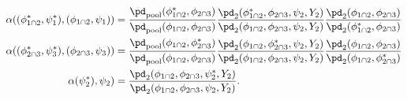 \begin{align}
  \alpha((\phi_{1 \cap 2}^{*}, \psi_{1}^{*}), (\phi_{1 \cap 2}, \psi_{1})) &= 
    \frac {
      \pd_{\text{pool}}(\phi_{1 \cap 2}^{*}, \phi_{2 \cap 3})
    } {
      \pd_{\text{pool}}(\phi_{1 \cap 2}, \phi_{2 \cap 3})
    }
    \frac {
      \pd_{2}(\phi_{1 \cap 2}^{*}, \phi_{2 \cap 3}, \psi_{2}, Y_{2})
    } {
      \pd_{2}(\phi_{1 \cap 2}, \phi_{2 \cap 3}, \psi_{2}, Y_{2})
    }
    \frac {
      \pd_{2} (\phi_{1 \cap 2}, \phi_{2 \cap 3})
    } {
      \pd_{2} (\phi_{1 \cap 2}^{*}, \phi_{2 \cap 3})
    }
  \\
  \alpha((\phi_{2 \cap 3}^{*}, \psi_{3}^{*}), (\phi_{2 \cap 3}, \psi_{3})) &= 
    \frac {
      \pd_{\text{pool}}(\phi_{1 \cap 2}, \phi_{2 \cap 3}^{*})
    } {
      \pd_{\text{pool}}(\phi_{1 \cap 2}, \phi_{2 \cap 3})
    }
    \frac {
      \pd_{2}(\phi_{1 \cap 2}, \phi_{2 \cap 3}^{*}, \psi_{2}, Y_{2})
    } {
      \pd_{2}(\phi_{1 \cap 2}, \phi_{2 \cap 3}, \psi_{2}, Y_{2})
    }
    \frac {
      \pd_{2} (\phi_{1 \cap 2}, \phi_{2 \cap 3})
    } {
      \pd_{2} (\phi_{1 \cap 2}, \phi_{2 \cap 3}^{*})
    }
  \\
  \alpha(\psi_{2}^{*}), \psi_{2}) &=
    \frac {
      \pd_{2}(\phi_{1 \cap 2}, \phi_{2 \cap 3}, \psi_{2}^{*}, Y_{2})
    } {
      \pd_{2}(\phi_{1 \cap 2}, \phi_{2 \cap 3}, \psi_{2}, Y_{2})
    }.
  \label{eqn:stage-two-acceptance}
\end{align}